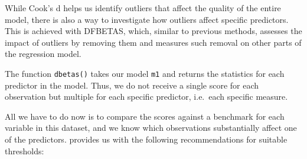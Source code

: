 \documentclass[
]{book}
\newenvironment{Shaded}{\begin{snugshade}}{\end{snugshade}}
\newcommand{\CommentTok}[1]{\textcolor[rgb]{0.56,0.35,0.01}{\textit{#1}}}
\newcommand{\DocumentationTok}[1]{\textcolor[rgb]{0.56,0.35,0.01}{\textbf{\textit{#1}}}}
\newcommand{\FunctionTok}[1]{\textcolor[rgb]{0.00,0.00,0.00}{#1}}
\newcommand{\NormalTok}[1]{#1}
\newcommand{\OtherTok}[1]{\textcolor[rgb]{0.56,0.35,0.01}{#1}}
\newcommand{\SpecialCharTok}[1]{\textcolor[rgb]{0.00,0.00,0.00}{#1}}
\begin{document}
While Cook's d helps us identify outliers that affect the quality of the entire model, there is also a way to investigate how outliers affect specific predictors. This is achieved with DFBETAS, which, similar to previous methods, assesses the impact of outliers by removing them and measures such removal on other parts of the regression model.

The function \texttt{dbetas()} takes our model \texttt{m1} and returns the statistics for each predictor in the model. Thus, we do not receive a single score for each observation but multiple for each specific predictor, i.e.~each specific measure.

\begin{Shaded}
\end{Shaded}

All we have to do now is to compare the scores against a benchmark for each variable in this dataset, and we know which observations substantially affect one of the predictors. \citet{cohen2014applied} provides us with the following recommendations for suitable thresholds:
\end{document}
